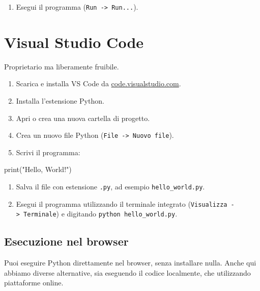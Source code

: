 \documentclass[
  letterpaper,
]{scrbook}
\newenvironment{Shaded}{\begin{snugshade}}{\end{snugshade}}
\newcommand{\BuiltInTok}[1]{\textcolor[rgb]{0.00,0.23,0.31}{#1}}
\newcommand{\NormalTok}[1]{\textcolor[rgb]{0.00,0.23,0.31}{#1}}
\newcommand{\StringTok}[1]{\textcolor[rgb]{0.13,0.47,0.30}{#1}}
\providecommand{\tightlist}{%
  \setlength{\itemsep}{0pt}\setlength{\parskip}{0pt}}\usepackage{longtable,booktabs,array}
\begin{document}
\begin{enumerate}
\def\labelenumi{\arabic{enumi}.}
\setcounter{enumi}{4}
\tightlist
\item
  Esegui il programma (\texttt{Run\ -\textgreater{}\ Run...}).
\end{enumerate}

\section{Visual Studio Code}

Proprietario ma liberamente fruibile.

\begin{enumerate}
\def\labelenumi{\arabic{enumi}.}
\item
  Scarica e installa VS Code da
  \href{https://code.visualstudio.com/}{code.visualstudio.com}.
\item
  Installa l'estensione Python.
\item
  Apri o crea una nuova cartella di progetto.
\item
  Crea un nuovo file Python
  (\texttt{File\ -\textgreater{}\ Nuovo\ file}).
\item
  Scrivi il programma:
\end{enumerate}

\begin{Shaded}
\begin{Highlighting}[]
\BuiltInTok{print}\NormalTok{(}\StringTok{"Hello, World!"}\NormalTok{)}
\end{Highlighting}
\end{Shaded}

\begin{enumerate}
\def\labelenumi{\arabic{enumi}.}
\setcounter{enumi}{5}
\item
  Salva il file con estensione \texttt{.py}, ad esempio
  \texttt{hello\_world.py}.
\item
  Esegui il programma utilizzando il terminale integrato
  (\texttt{Visualizza\ -\textgreater{}\ Terminale}) e digitando
  \texttt{python\ hello\_world.py}.
\end{enumerate}

\subsection{Esecuzione nel browser}\label{esecuzione-nel-browser}

Puoi eseguire Python direttamente nel browser, senza installare nulla.
Anche qui abbiamo diverse alternative, sia eseguendo il codice
localmente, che utilizzando piattaforme online.
\end{document}
